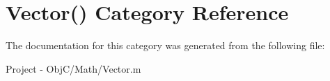 \hypertarget{category_vector_07_08}{}\section{Vector() Category Reference}
\label{category_vector_07_08}


The documentation for this category was generated from the following file\+:\begin{DoxyCompactItemize}
\item 
Project -\/ Obj\+C/\+Math/Vector.\+m\end{DoxyCompactItemize}
